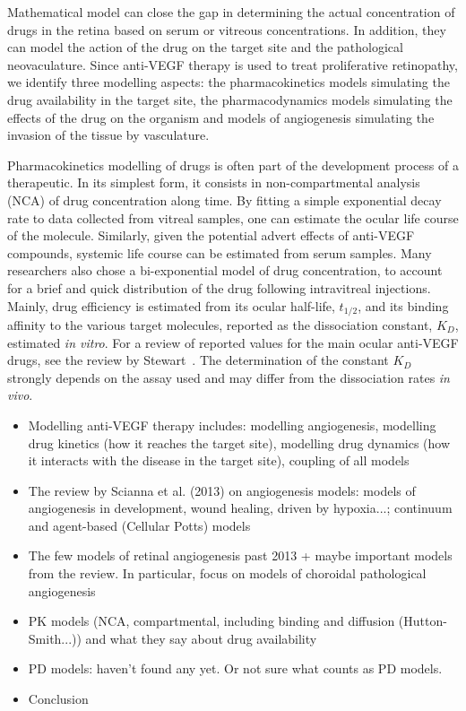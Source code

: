 \documentclass[12pt,a4paper]{article}
\begin{document}
Mathematical model can close the gap in determining the actual concentration of drugs in the retina based on serum or vitreous concentrations.
In addition, they can model the action of the drug on the target site and the pathological neovaculature.
Since anti-VEGF therapy is used to treat proliferative retinopathy, we identify three modelling aspects: the pharmacokinetics models simulating the drug availability in the target site, the pharmacodynamics models simulating the effects of the drug on the organism and models of angiogenesis simulating the invasion of the tissue by vasculature.

Pharmacokinetics modelling of drugs is often part of the development process of a therapeutic.
In its simplest form, it consists in non-compartmental analysis (NCA) of drug concentration along time.
By fitting a simple exponential decay rate to data collected from vitreal samples, one can estimate the ocular life course of the molecule.
Similarly, given the potential advert effects of anti-VEGF compounds, systemic life course can be estimated from serum samples.
Many researchers also chose a bi-exponential model of drug concentration, to account for a brief and quick distribution of the drug following intravitreal injections.
Mainly, drug efficiency is estimated from its ocular half-life, $t_{1/2}$, and its binding affinity to the various target molecules, reported as the dissociation constant, $K_D$, estimated \textit{in vitro}.
For a review of reported values for the main ocular anti-VEGF drugs, see the review by Stewart~\cite{stewart_pharmacokinetics_2014}.
The determination of the constant $K_D$ strongly depends on the assay used and may differ from the dissociation rates \textit{in vivo}.
\newpage

\begin{itemize}
\item Modelling anti-VEGF therapy includes: modelling angiogenesis, modelling drug kinetics (how it reaches the target site), modelling drug dynamics (how it interacts with the disease in the target site), coupling of all models
\item The review by Scianna et al. (2013) on angiogenesis models: models of angiogenesis in development, wound healing, driven by hypoxia...; continuum and agent-based (Cellular Potts) models
\item The few models of retinal angiogenesis past 2013 + maybe important models from the review. In particular, focus on models of choroidal pathological angiogenesis 
\item PK models (NCA, compartmental, including binding and diffusion (Hutton-Smith...)) and what they say about drug availability
\item PD models: haven't found any yet. Or not sure what counts as PD models.
\item Conclusion
\end{itemize}


{\normalsize }
\end{document}
